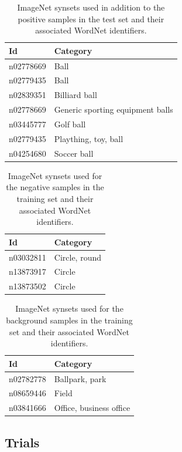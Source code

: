 \documentclass{llncs}
\begin{document}
{{			\begin{table}
				\centering
				\caption{ImageNet synsets used in addition to the positive samples in the test set and their associated WordNet identifiers.}
				\label{tab:test_set}
				\begin{tabularx}{\textwidth}{@{}lX@{}}
					\toprule
					\textbf{Id} & \textbf{Category} \\
					\midrule
						n02778669 & Ball \\
						n02779435 & Ball \\
						n02839351 & Billiard ball \\
						n02778669 & Generic sporting equipment balls \\
						n03445777 & Golf ball \\
						n02779435 & Plaything, toy, ball \\
						n04254680 & Soccer ball \\
					\bottomrule
				\end{tabularx}
			\end{table}

			\begin{table}
				\centering
				\caption{ImageNet synsets used for the negative samples in the training set and their associated WordNet identifiers.}
				\label{tab:negative_samples}
				\begin{tabularx}{\textwidth}{@{}lX@{}}
					\toprule
					\textbf{Id} & \textbf{Category} \\
					\midrule
						n03032811 & Circle, round \\
						n13873917 & Circle \\
						n13873502 & Circle \\
					\bottomrule
				\end{tabularx}
			\end{table}

			\begin{table}
				\centering
				\caption{ImageNet synsets used for the background samples in the training set and their associated WordNet identifiers.}
				\label{tab:background_samples}
				\begin{tabularx}{\textwidth}{@{}lX@{}}
					\toprule
					\textbf{Id} & \textbf{Category} \\
					\midrule
						n02782778 & Ballpark, park \\
						n08659446 & Field \\
						n03841666 & Office, business office \\
					\bottomrule
				\end{tabularx}
			\end{table}

		}


		\subsection{Trials} {
		}
	}
\end{document}
